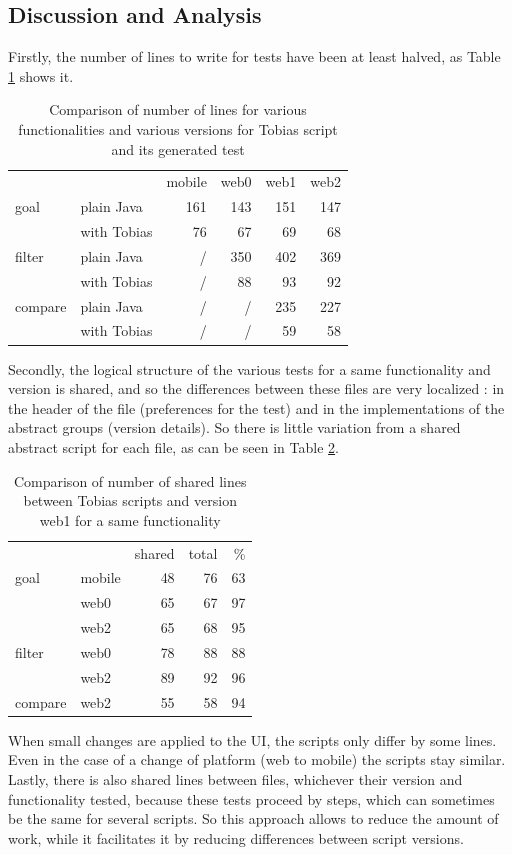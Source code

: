 \documentclass{chi-ext}
\begin{document}
\subsection{Discussion and Analysis}
Firstly, the number of lines to write for tests have been at least halved, as Table \ref{table:scriptssize} shows it.
\begin{table}
\begin{tabular}{l l r r r r}
			&					&	mobile	&	web0	&	web1	&	web2	\\
goal		&	plain Java	&	161		&	143		&	151		&	147		\\
			&	with Tobias	&	76		&	67		&	69		&	68		\\
filter		&	plain Java	&	/		&	350		&	402		&	369		\\
			&	with Tobias	&	/		&	88		&	93		&	92		\\
compare	&	plain Java	&	/		&	/		&	235		&	227		\\
			&	with Tobias	&	/		&	/		&	59		&	58
\end{tabular}
\caption{Comparison of number of lines for various functionalities and various versions for Tobias script and its generated test}
\label{table:scriptssize}
\end{table}
Secondly, the logical structure of the various tests for a same functionality and version is shared, and so the differences between these files are very localized : in the header of the file (preferences for the test) and in the implementations of the abstract groups (version details). So there is little variation from a shared abstract script for each file, as can be seen in Table \ref{table:scripts-similarity}.
\begin{table}
\begin{tabular}{l l r r r}
			&			&	shared	&	total	&	\%	\\
goal		&	mobile	&	48		&	76		&	63	\\
			&	web0	&	65		&	67		&	97	\\
			&	web2	&	65		&	68		&	95	\\
filter		&	web0	&	78		&	88		&	88	\\
			&	web2	&	89		&	92		&	96	\\
compare	&	web2	&	55		&	58		&	94
\end{tabular}
\caption{Comparison of number of shared lines between Tobias scripts and version web1 for a same functionality}
\label{table:scripts-similarity}
\end{table}
When small changes are applied to the UI, the scripts only differ by some lines. Even in the case of a change of platform (web to mobile) the scripts stay similar.
Lastly, there is also shared lines between files, whichever their version and functionality tested, because these tests proceed by steps, which can sometimes be the same for several scripts.
So this approach allows to reduce the amount of work, while it facilitates it by reducing differences between script versions.
\end{document}
